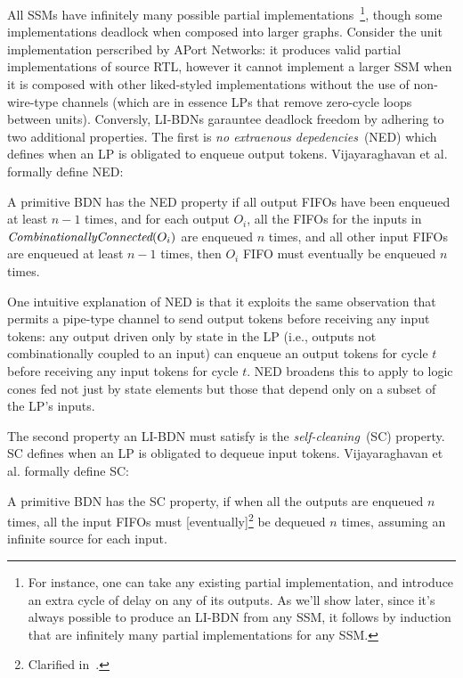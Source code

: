 All SSMs have infinitely many possible partial implementations~\footnote{For
instance, one can take any existing partial implementation, and introduce an
extra cycle of delay on any of its outputs. As we'll show later, since it's
always possible to produce an LI-BDN from any SSM, it follows by induction that are infinitely many partial implementations
for any SSM.}, though some implementations deadlock when composed into larger graphs.
Consider the unit implementation perscribed by APort Networks: it produces valid partial implementations of
source RTL, however it cannot implement a larger SSM when it is composed
with other liked-styled implementations without the use of non-wire-type channels (which are in essence LPs that remove zero-cycle loops between units).
Conversly, LI-BDNs garauntee deadlock freedom by adhering to two additional properties.
The first is \emph{no extraenous depedencies}~(NED) which defines when an LP is obligated to enqueue output tokens. Vijayaraghavan et al.\cite{LIBDN} formally define NED:

\begin{widequote}
A primitive BDN has the NED property if all output FIFOs have been enqueued at least $n-1$ times,
and for each output $O_i$, all the FIFOs for the inputs in $\emph{CombinationallyConnected}(O_i)$
are enqueued $n$ times, and all other input FIFOs are enqueued at least $n-1$ times, then $O_i$ FIFO
must eventually be enqueued $n$ times.
\end{widequote}\label{def:ned}

One intuitive explanation of NED is that it exploits the same observation that
permits a pipe-type channel to send output tokens before receiving any input
tokens: any output driven only by state in the LP (i.e., outputs not
combinationally coupled to an input) can enqueue an output tokens for cycle
$t$ before receiving any input tokens for cycle $t$. NED broadens this to apply to logic cones fed not just by state
elements but those that depend only on a subset of the LP's inputs.

The second property an LI-BDN must satisfy is the \emph{self-cleaning}~(SC) property. SC 
defines when an LP is obligated to dequeue input tokens. Vijayaraghavan et al.\cite{LIBDN} formally define SC:

\begin{widequote}
A primitive BDN has the SC property, if when all the
outputs are enqueued $n$ times, all the input FIFOs must
[eventually]\footnote{Clarified in~\cite{LIBDNMasters}.} be dequeued $n$ times, assuming an infinite source for each
input.
\end{widequote}\label{def:sc}

